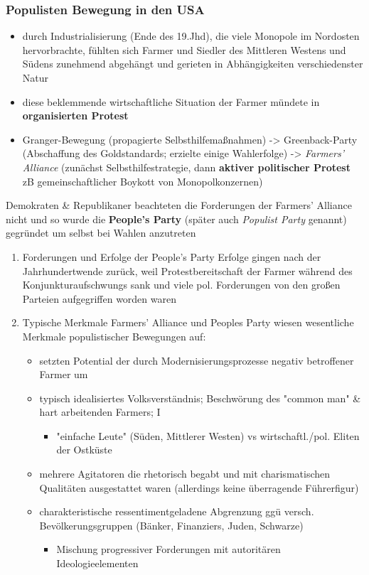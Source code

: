 \documentclass[11pt]{article}
\begin{document}
\subsubsection{Populisten Bewegung in den USA}
\label{sec:org6a69fe8}
\begin{itemize}
\item durch Industrialisierung (Ende des 19.Jhd), die viele Monopole im Nordosten hervorbrachte, fühlten sich Farmer und Siedler des Mittleren Westens und Südens zunehmend abgehängt und gerieten in Abhängigkeiten verschiedenster Natur
\item diese beklemmende wirtschaftliche Situation der Farmer mündete in \textbf{organisierten Protest}
\item Granger-Bewegung (propagierte Selbsthilfemaßnahmen) -> Greenback-Party (Abschaffung des Goldstandards; erzielte einige Wahlerfolge) -> \emph{Farmers' Alliance} (zunächst Selbsthilfestrategie, dann \textbf{aktiver politischer Protest} zB gemeinschaftlicher Boykott von Monopolkonzernen)
\end{itemize}

Demokraten \& Republikaner beachteten die Forderungen der Farmers' Alliance nicht und so wurde die \textbf{People's Party} (später auch \emph{Populist Party} genannt) gegründet um selbst bei Wahlen anzutreten
\begin{enumerate}
\item Forderungen und Erfolge der People's Party
\label{sec:orgb1072d8}
Erfolge gingen nach der Jahrhundertwende zurück, weil Protestbereitschaft der Farmer während des Konjunkturaufschwungs sank und viele pol. Forderungen von den großen Parteien aufgegriffen worden waren

\item Typische Merkmale
\label{sec:org04daf63}
Farmers' Alliance und Peoples Party wiesen wesentliche Merkmale populistischer Bewegungen auf:
\begin{itemize}
\item setzten Potential der durch Modernisierungsprozesse negativ betroffener Farmer um
\item typisch idealisiertes Volksverständnis; Beschwörung des "common man" \& hart arbeitenden Farmers; I
\begin{itemize}
\item "einfache Leute" (Süden, Mittlerer Westen) vs wirtschaftl./pol. Eliten der Ostküste
\end{itemize}
\item mehrere Agitatoren die rhetorisch begabt und mit charismatischen Qualitäten ausgestattet waren (allerdings keine überragende Führerfigur)
\item charakteristische ressentimentgeladene Abgrenzung ggü versch. Bevölkerungsgruppen (Bänker, Finanziers, Juden, Schwarze)
\begin{itemize}
\item Mischung progressiver Forderungen mit autoritären Ideologieelementen
\end{itemize}
\end{itemize}
\end{enumerate}
\end{document}
